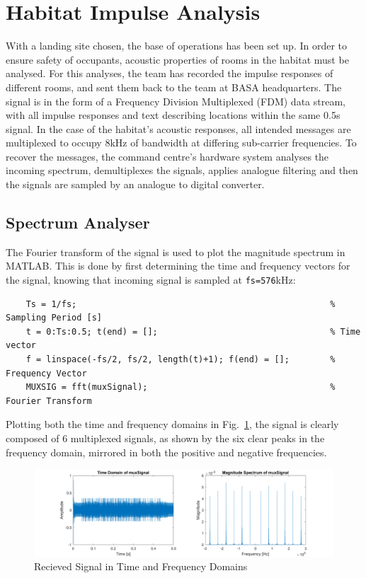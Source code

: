 \documentclass[12pt]{article}
\numberwithin{equation}{section}
\numberwithin{figure}{section}
\numberwithin{table}{section}
\begin{document}
\section{Habitat Impulse Analysis}
With a landing site chosen, the base of operations has been set up. In order to
ensure safety of occupants, acoustic properties of rooms in the habitat must be
analysed. For this analyses, the team has recorded the impulse responses of
different rooms, and sent them back to the team at BASA headquarters. The
signal is in the form of a Frequency Division Multiplexed (FDM) data stream,
with all impulse responses and text describing locations within the same 0.5s
signal. In the case of the habitat's acoustic responses, all intended messages
are multiplexed to occupy 8kHz of bandwidth at differing sub-carrier
frequencies. To recover the messages, the command centre's hardware system
analyses the incoming spectrum, demultiplexes the signals, applies analogue
filtering and then the signals are sampled by an analogue to digital converter.
\subsection{Spectrum Analyser}
The Fourier transform of the signal is used to plot the magnitude spectrum in
MATLAB\@. This is done by first determining the time and frequency vectors for
the signal, knowing that incoming signal is sampled at \verb+fs=576+kHz:

\begin{verbatim}
    Ts = 1/fs;                                                  % Sampling Period [s]
    t = 0:Ts:0.5; t(end) = [];                                  % Time vector
    f = linspace(-fs/2, fs/2, length(t)+1); f(end) = [];        % Frequency Vector
    MUXSIG = fft(muxSignal);                                    % Fourier Transform
\end{verbatim}

Plotting both the time and frequency domains in Fig.~\ref{fig:p3-multiplexed},
the signal is clearly composed of 6 multiplexed signals, as shown by the six
clear peaks in the frequency domain, mirrored in both the positive and negative
frequencies.

\begin{figure}[ht]
    \centering
    \includegraphics{figures/p3-multiplexed.png}
    \caption{Recieved Signal in Time and Frequency Domains\label{fig:p3-multiplexed}}
\end{figure}
\end{document}
